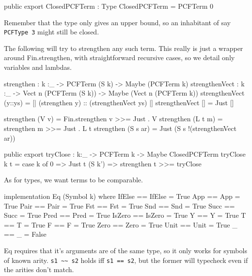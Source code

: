 \begin{code}
public export
ClosedPCFTerm : Type
ClosedPCFTerm = PCFTerm 0
\end{code}

Remember that the type only gives an upper bound, so an inhabitant of say
\lstinline{PCFType 3} might still be closed.

The following will try to strengthen any such term. This really is just a
wrapper around Fin.strengthen, with straightforward recursive cases,
so we detail only variables and lambdas.   %

\begin{code}
strengthen : {k :_} -> PCFTerm (S k) -> Maybe (PCFTerm k)
strengthenVect : {k :_} -> Vect n (PCFTerm (S k)) -> Maybe (Vect n (PCFTerm k))
strengthenVect (y::ys) = [| (strengthen y) :: (strengthenVect ys) |]
strengthenVect [] = Just []
\end{code}


\begin{code}
strengthen (V v)    = Fin.strengthen v >>= Just . V
strengthen (L t m)  = strengthen m     >>= Just . L t
strengthen (S s ar) = Just (S s !(strengthenVect ar))
\end{code}

\begin{code}
public export
tryClose : {k:_} -> PCFTerm k -> Maybe ClosedPCFTerm
tryClose {k} t = case k of
                 0      => Just t
                 (S k') => strengthen t >>= tryClose
\end{code}

As for types, we want terms to be comparable.

\begin{hidden}
implementation Eq (Symbol k) where
  IfElse == IfElse = True
  App    == App    = True
  Pair   == Pair   = True
  Fst    == Fst    = True
  Snd    == Snd    = True
  Succ   == Succ   = True
  Pred   == Pred   = True
  IsZero == IsZero = True
  Y      == Y      = True
  T      == T      = True
  F      == F      = True
  Zero   == Zero   = True
  Unit   == Unit   = True
  _      == _      = False
\end{hidden}

Eq requires that it's arguments are of the same type, so it only works for
symbols of known arity. \lstinline{s1 ~~ s2} holds iff \lstinline{s1 == s2},
but the former will typecheck even if the arities don't match.

